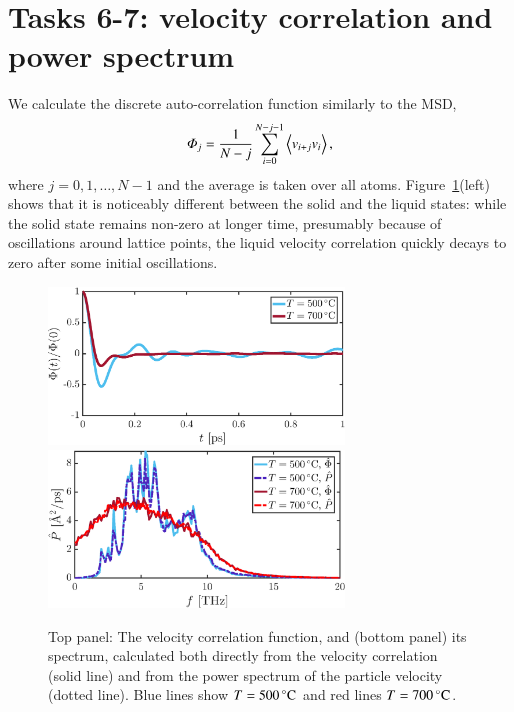 \section*{Tasks 6-7: velocity correlation and power spectrum}

We calculate the discrete auto-correlation function similarly to the
MSD, 
\begin{equation}
\varPhi_j = \frac{1}{N-j}\sum_{i=0}^{N-j-1} \ev{v_{i+j}v_{i}}, \label{eq:Phi}
\end{equation}
where $j=0,1,\ldots,N-1$ and the average is taken over all atoms. Figure~\ref{fig:spectrum}(left) shows that it is noticeably different between the solid and the liquid states: while the solid state remains non-zero at longer time, presumably because of oscillations around lattice points, the liquid velocity correlation quickly decays to zero after some initial oscillations. 

\begin{figure}[!ht]
\begin{center}
  \includegraphics[width=0.7\textwidth]{../figures/Phi-t} \\
    \includegraphics[width=0.7\textwidth]{../figures/P-freq} 
  \caption{Top panel: The velocity correlation function, and (bottom panel) its spectrum, calculated both directly from the velocity correlation (solid line) and from the power spectrum of the particle velocity (dotted line). Blue lines show $T=\unit[500]{^\circ C}$ and red lines $T=\unit[700]{^\circ C}$.   
  }
  \label{fig:spectrum}
\end{center}
\end{figure}


